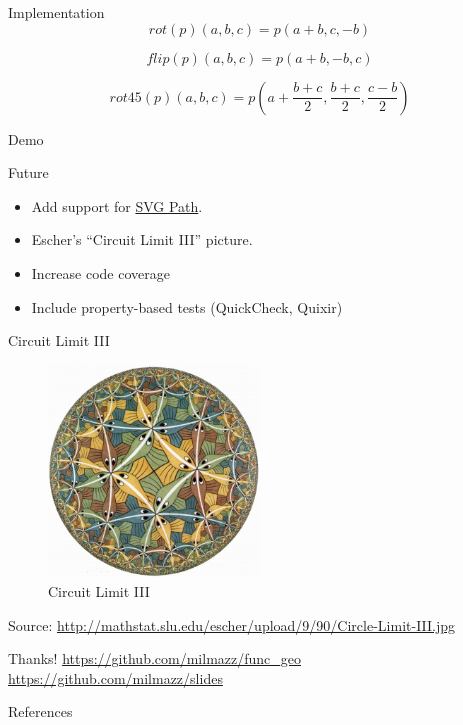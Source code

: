 \documentclass{beamer}
\begin{document}
    \begin{frame}{Implementation}
        \begin{equation*}
        rot(p)(a, b, c) = p(a + b, c, -b)
        \end{equation*}

        \begin{equation*}
        flip(p)(a, b, c) = p(a + b, -b, c)
        \end{equation*}

        \begin{equation*}
        rot45(p)(a, b, c) = p(a + \frac{b + c}{2}, \frac{b + c}{2}, \frac{c - b}{2})
        \end{equation*}
    \end{frame}

    \begin{frame}[standout]
        Demo
    \end{frame}

    \begin{frame}{Future}
        \begin{itemize}
            \item Add support for \href{https://developer.mozilla.org/en/docs/Web/SVG/Tutorial/Paths}{SVG Path}.
            \item Escher's ``Circuit Limit III'' picture.
            \item Increase code coverage
            \item Include property-based tests (QuickCheck, Quixir)
        \end{itemize}

    \end{frame}

    \begin{frame}{Circuit Limit III}
        \begin{figure}
            \centering
            \includegraphics[width=0.5\textwidth]{./figs/Circle-Limit-III}
            \caption{Circuit Limit III\label{fig:circuit_limit_iii}}
        \end{figure}
        {\tiny Source: \url{http://mathstat.slu.edu/escher/upload/9/90/Circle-Limit-III.jpg}}
    \end{frame}

    \begin{frame}[standout]
        Thanks!
        \url{https://github.com/milmazz/func\_geo}
        \url{https://github.com/milmazz/slides}
    \end{frame}

    \begin{frame}[allowframebreaks]{References}
        
        
    \end{frame}
\end{document}
